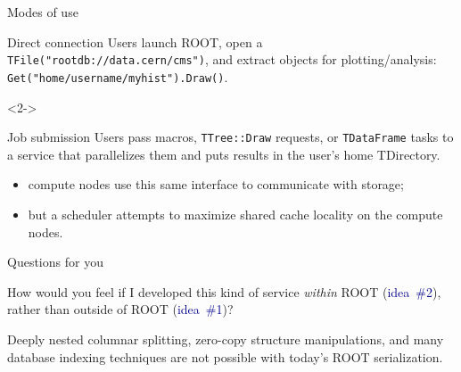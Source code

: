 \documentclass[aspectratio=169]{beamer}
\begin{document}
\begin{frame}{Modes of use}
\vspace{0.5 cm}
\begin{block}{Direct connection}
Users launch ROOT, open a {\tt TFile("rootdb://data.cern/cms")}, and extract objects for plotting/analysis: {\tt Get("home/username/myhist").Draw()}.
\end{block}

\vspace{0.5 cm}
\begin{uncoverenv}<2->
\begin{block}{Job submission}
Users pass macros, {\tt TTree::Draw} requests, or {\tt TDataFrame} tasks to a service that parallelizes them and puts results in the user's home TDirectory.

\begin{itemize}
\item<3-> compute nodes use this same interface to communicate with storage;
\item<4-> but a scheduler attempts to maximize shared cache locality on the compute nodes.
\end{itemize}
\end{block}
\end{uncoverenv}

\vspace{0.25 cm}
\begin{center}
\large {}
\end{center}
\end{frame}

\begin{frame}{Questions for you}
\vspace{0.5 cm}
\begin{description}\setlength{\itemsep}{0.5 cm}
\item[Question:] How would you feel if I developed this kind of service {\it within} ROOT (\textcolor{darkblue}{idea~\#2}), rather than outside of ROOT (\textcolor{darkblue}{idea~\#1})?

\vspace{0.25 cm}

\item[Question:]<3-> Deeply nested columnar splitting, zero-copy structure manipulations, and many database indexing techniques are not possible with today's ROOT serialization.

\vspace{0.25 cm}

\vspace{0.25 cm}
\end{description}
\end{frame}
\end{document}
